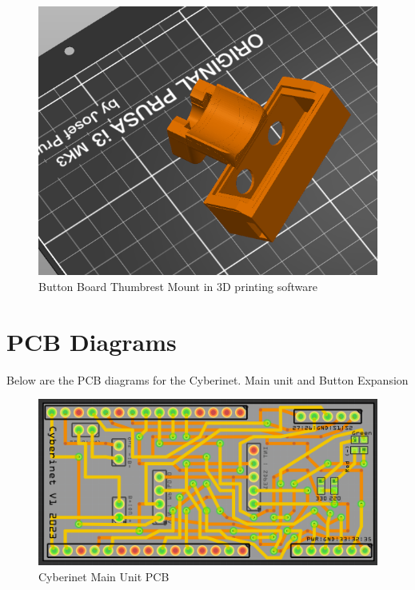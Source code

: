 \begin{figure}
    \centering
    \includegraphics[scale=0.8]{diagrams/3D Models/thumbrestPic.png}
    \caption{Button Board Thumbrest Mount in 3D printing software}
    \label{fig:thumbrest}
\end{figure}



\section{PCB Diagrams}
Below are the PCB diagrams for the Cyberinet. Main unit and Button Expansion


\begin{center}
\begin{figure}
    \centering
    \includegraphics[scale=0.3]{diagrams/PCBs/mainBoard.png}
    \caption{Cyberinet Main Unit PCB}
    \label{fig:mainPCB}
\end{figure}
\end{center}



